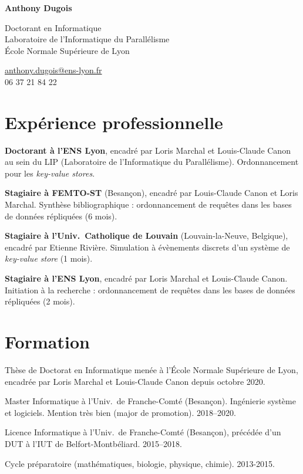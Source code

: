 \documentclass[12pt]{article}
\makeatletter
\newcommand{\myname}{Anthony Dugois}
\newcommand{\mymail}{anthony.dugois@ens-lyon.fr}
\newcommand{\myphone}{06 37 21 84 22}
\newcommand{\myaffiliation}{Doctorant en Informatique\\
  Laboratoire de l'Informatique du Parallélisme\\
  École Normale Supérieure de Lyon}
\newcommand{\mytitle}{%
  \raggedright

  {\normalfont\bfseries\huge\myname}
  
  \vspace{10pt}

  \begin{minipage}[t]{0.65\textwidth}
    \myaffiliation
  \end{minipage}%
  \begin{minipage}[t]{0.35\textwidth}
    \flushright
    \href{mailto:\mymail}{\mymail} \\
    \myphone
  \end{minipage}
}
\newcounter{cvitems}
\newcommand{\cvitem}[2]{\item[#1] #2}
\makeatother
\begin{document}
\mytitle

\section*{Expérience professionnelle}

\begin{cvitems}
  \cvitem{2020--}{\textbf{Doctorant à l'ENS Lyon}, encadré par Loris Marchal et Louis-Claude Canon
  au sein du LIP (Laboratoire de l'Informatique du Parallélisme).  
  Ordonnancement pour les \emph{key-value stores}.}

  \cvitem{2020}{\textbf{Stagiaire à FEMTO-ST} (Besançon), encadré par Louis-Claude Canon et Loris
  Marchal.  
  Synthèse bibliographique : ordonnancement de requêtes dans les bases de données répliquées (6
  mois).}

  \cvitem{2019}{\textbf{Stagiaire à l'Univ.\ Catholique de Louvain}
  (Louvain-la-Neuve, Belgique), encadré par Etienne Rivière.  
  Simulation à évènements discrets d'un système de \emph{key-value store} (1 mois).}

  \cvitem{2019}{\textbf{Stagiaire à l'ENS Lyon}, encadré par Loris Marchal et Louis-Claude Canon.  
  Initiation à la recherche : ordonnancement de requêtes dans les bases de données répliquées (2
  mois).}


\end{cvitems}

\section*{Formation}

\begin{cvitems}
  \cvitem{\bfseries Doctorat}{Thèse de Doctorat en Informatique menée à l'École Normale Supérieure
  de Lyon, encadrée par Loris Marchal et Louis-Claude Canon depuis octobre 2020.}

  \cvitem{\bfseries Master}{Master Informatique à l'Univ.\ de Franche-Comté (Besançon).  
  Ingénierie système et logiciels.  
  Mention très bien (major de promotion).  
  2018--2020.}

  \cvitem{\bfseries Licence}{Licence Informatique à l'Univ.\ de Franche-Comté (Besançon), précédée
  d'un DUT à l'IUT de Belfort-Montbéliard.  
  2015--2018.}

  \cvitem{\bfseries CPGE}{Cycle préparatoire (mathématiques, biologie, physique, chimie).  
  2013-2015.}
\end{cvitems}
\end{document}
